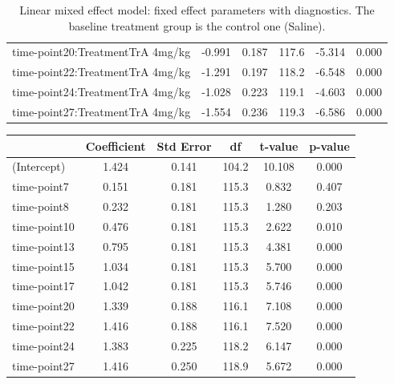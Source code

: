 \begin{table}
\begin{tabular}{lccccc}
		time-point20:TreatmentTrA 4mg/kg & -0.991      & 0.187     & 117.6 & -5.314  & 0.000   \\
		time-point22:TreatmentTrA 4mg/kg & -1.291      & 0.197     & 118.2 & -6.548  & 0.000   \\
		time-point24:TreatmentTrA 4mg/kg & -1.028      & 0.223     & 119.1 & -4.603  & 0.000   \\
		time-point27:TreatmentTrA 4mg/kg & -1.554      & 0.236     & 119.3 & -6.586  & 0.000   \\
		\hline
	\end{tabular}
	\caption{Linear mixed effect model: fixed effect parameters with diagnostics.
	The baseline treatment group is the control one (Saline).}
	\label{LME_factor_TrA_baseline_Saline}
\end{table}


\begin{table}
	\centering
	\small
	\begin{tabular}{lccccc}
		\hline
		                                & Coefficient & Std Error & df    & t-value & p-value \\
		\hline
		(Intercept)                     & 1.424       & 0.141     & 104.2 & 10.108  & 0.000   \\
		time-point7                      & 0.151       & 0.181     & 115.3 & 0.832   & 0.407   \\
		time-point8                      & 0.232       & 0.181     & 115.3 & 1.280   & 0.203   \\
		time-point10                     & 0.476       & 0.181     & 115.3 & 2.622   & 0.010   \\
		time-point13                     & 0.795       & 0.181     & 115.3 & 4.381   & 0.000   \\
		time-point15                     & 1.034       & 0.181     & 115.3 & 5.700   & 0.000   \\
		time-point17                     & 1.042       & 0.181     & 115.3 & 5.746   & 0.000   \\
		time-point20                     & 1.339       & 0.188     & 116.1 & 7.108   & 0.000   \\
		time-point22                     & 1.416       & 0.188     & 116.1 & 7.520   & 0.000   \\
		time-point24                     & 1.383       & 0.225     & 118.2 & 6.147   & 0.000   \\
		time-point27                     & 1.416       & 0.250     & 118.9 & 5.672   & 0.000   \\

\end{tabular}
\end{table}
